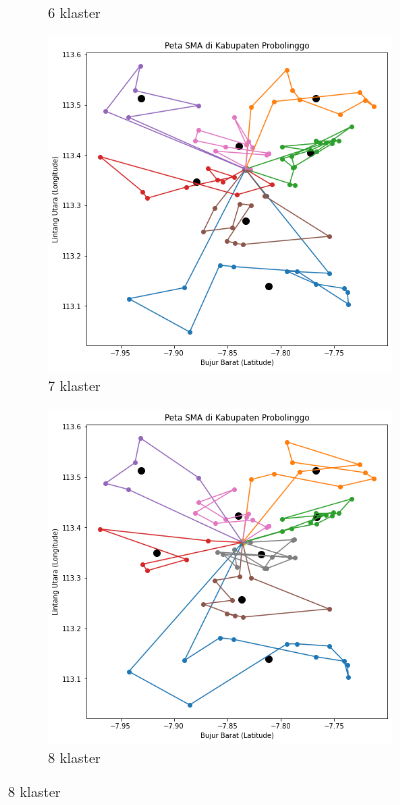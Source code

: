 \begin{frame}
\begin{figure}
\begin{subfigure}[h]{0.2\textwidth}
		\caption{6 klaster}
		\end{subfigure}
		\hfill
		\begin{subfigure}[h]{0.2\textwidth}
		\includegraphics[width=\textwidth]{gambar/hasil_mtsp/7}
		\caption{7 klaster}
		\end{subfigure}
		\hfill
		\begin{subfigure}[h]{0.2\textwidth}
		\includegraphics[width=\textwidth]{gambar/hasil_mtsp/8}
		\caption{8 klaster}
		\end{subfigure}
	\end{figure}
\end{frame}